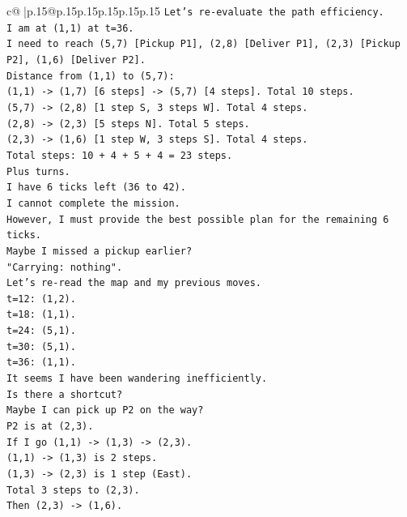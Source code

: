 \documentclass{article}
\begin{document}
{\begin{supertabular}{c@{$\;$}|p{.15\linewidth}@{}p{.15\linewidth}p{.15\linewidth}p{.15\linewidth}p{.15\linewidth}p{.15\linewidth}}
{{{\texttt{Let's re{-}evaluate the path efficiency.} \\
\texttt{I am at (1,1) at t=36.} \\
\texttt{I need to reach (5,7) {[}Pickup P1{]}, (2,8) {[}Deliver P1{]}, (2,3) {[}Pickup P2{]}, (1,6) {[}Deliver P2{]}.} \\
\texttt{Distance from (1,1) to (5,7):} \\
\texttt{(1,1) {-}> (1,7) {[}6 steps{]} {-}> (5,7) {[}4 steps{]}. Total 10 steps.} \\
\texttt{(5,7) {-}> (2,8) {[}1 step S, 3 steps W{]}. Total 4 steps.} \\
\texttt{(2,8) {-}> (2,3) {[}5 steps N{]}. Total 5 steps.} \\
\texttt{(2,3) {-}> (1,6) {[}1 step W, 3 steps S{]}. Total 4 steps.} \\
\texttt{Total steps: 10 + 4 + 5 + 4 = 23 steps.} \\
\texttt{Plus turns.} \\
\texttt{I have 6 ticks left (36 to 42).} \\
\texttt{I cannot complete the mission.} \\
\texttt{However, I must provide the best possible plan for the remaining 6 ticks.} \\
\texttt{Maybe I missed a pickup earlier?} \\
\texttt{"Carrying: nothing".} \\
\texttt{Let's re{-}read the map and my previous moves.} \\
\texttt{t=12: (1,2).} \\
\texttt{t=18: (1,1).} \\
\texttt{t=24: (5,1).} \\
\texttt{t=30: (5,1).} \\
\texttt{t=36: (1,1).} \\
\texttt{It seems I have been wandering inefficiently.} \\
\texttt{Is there a shortcut?} \\
\texttt{Maybe I can pick up P2 on the way?} \\
\texttt{P2 is at (2,3).} \\
\texttt{If I go (1,1) {-}> (1,3) {-}> (2,3).} \\
\texttt{(1,1) {-}> (1,3) is 2 steps.} \\
\texttt{(1,3) {-}> (2,3) is 1 step (East).} \\
\texttt{Total 3 steps to (2,3).} \\
\texttt{Then (2,3) {-}> (1,6).} \\
}}}
\end{supertabular}}
\end{document}
